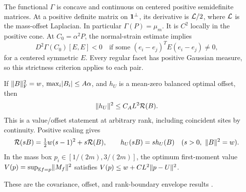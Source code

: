 \begin{prior}
\label{prior:value}
The functional $\Gamma$ is concave and
continuous on centered positive semidefinite matrices. At a positive
definite matrix on $\mathbf 1^\perp$, its derivative is $\mathcal L/2$, where
$\mathcal L$ is the mass-offset Laplacian. In particular
$\Gamma(P)=\mu_m$. It is $C^2$ locally in the positive cone. At
$C_0=\alpha^2P$, the normal-strain estimate implies
\begin{equation}\label{eq:reference-normal-strain}
 D^2\Gamma(C_0)[E,E]<0
 \quad\text{if some }(e_i-e_j)^TE(e_i-e_j)\ne0,
\end{equation}
for a centered symmetric $E$. Every regular facet has positive Gaussian
measure, so this strictness criterion applies to each pair.

If $\lVert B\rVert_{\mathrm F}^2=w$, $\max_i\lvert B_i\rvert\le A\alpha$, and $h_U$
is a mean-zero balanced optimal offset, then
\begin{equation}\label{eq:offset-input}
                         \lVert h_U\rVert^2\le C_A L^2\mathcal R(B).
\end{equation}
This is a value/offset statement at arbitrary rank, including coincident
sites by continuity. Positive scaling gives
\begin{equation}\label{eq:radial-identity}
 \mathcal R(sB)=\tfrac12 w(s-1)^2+s\mathcal R(B),\qquad
 h_U(sB)=s h_U(B)\quad(s>0,\ \lVert B\rVert^2=w).
\end{equation}
In the mass box $p_i\in[1/(2m),3/(2m)]$, the optimum first-moment value
$V(p)=\sup_{\mathbb E f=p}\lVert M_f\rVert^2$ satisfies
$V(p)\le w+CL^2\lVert p-U\rVert^2$.
\end{prior}
These are the covariance, offset, and rank-boundary envelope results
\cite{covariance,offset,masswindow,graphclarification}.

